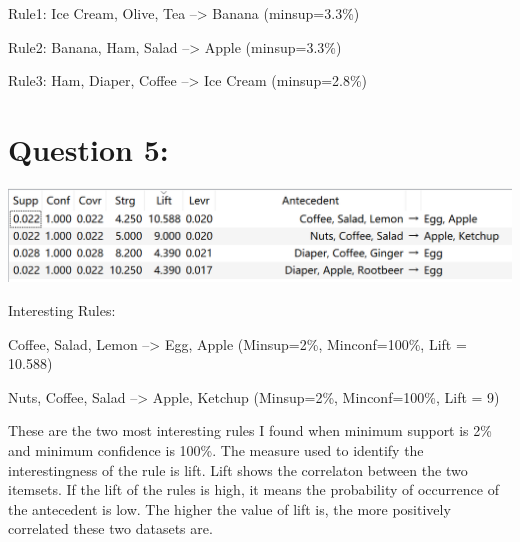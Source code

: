\documentclass[titlepage]{article}
\begin{document}
Rule1: Ice Cream, Olive, Tea --> Banana (minsup=3.3\%)

Rule2: Banana, Ham, Salad --> Apple (minsup=3.3\%)

Rule3: Ham, Diaper, Coffee --> Ice Cream (minsup=2.8\%)

\section{Question 5:}
\label{sec:orgc8525df}
\begin{center}
\begin{center}
\includegraphics[width=.9\linewidth]{interest.PNG}
\end{center}
\end{center}

Interesting Rules:

Coffee, Salad, Lemon --> Egg, Apple   (Minsup=2\%, Minconf=100\%, Lift = 10.588)

Nuts, Coffee, Salad --> Apple, Ketchup     (Minsup=2\%, Minconf=100\%, Lift = 9)

These are the two most interesting rules I found when minimum support is 2\%
and minimum confidence is 100\%. The measure used to identify the
interestingness of the rule is lift. Lift shows the correlaton between the two
itemsets. If the lift of the rules is high, it means the probability of
occurrence of the antecedent is low. The higher the value of lift is, the more
positively correlated these two datasets are.
\end{document}
